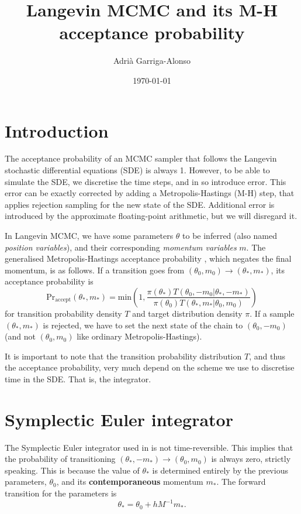 \documentclass{article}
\author{Adrià Garriga-Alonso}
\date{\today}
\title{Langevin MCMC and its M-H acceptance probability}
\begin{document}
\maketitle
{}

\section{Introduction}
\label{sec:orgb532d68}
The acceptance probability of an MCMC sampler that follows the Langevin
stochastic differential equations (SDE) is always 1. However, to be able to
simulate the SDE, we discretise the time steps, and in so introduce error.
This error can be exactly corrected \cite{sarkka_solin_2019} by adding a
Metropolis-Hastings (M-H) step, that applies rejection sampling for the new
state of the SDE. Additional error is introduced by the approximate
floating-point arithmetic, but we will disregard it.

In Langevin MCMC, we have some parameters \(\theta\) to be inferred (also named
\emph{position variables}), and their corresponding \emph{momentum variables} \(m\). The
generalised Metropolis-Hastings acceptance probability \cite{song2020hams},
which negates the final momentum, is as follows. If a transition goes from 
\((\theta_0, m_0) \to (\theta_*, m_*)\), its acceptance probability is
\begin{equation}
  \text{Pr}_\text{accept}(\theta_*, m_*) = \text{min}\left(1,
      \frac{\pi(\theta_*) T(\theta_0, -m_0 | \theta_*, -m_*)}
          {\pi(\theta_0) T(\theta_*, m_* | \theta_0, m_0)} \right)
\end{equation}
for transition probability density \(T\) and target distribution density \(\pi\).
If a sample \((\theta_*, m_*)\) is rejected, we have to set the next state of
the chain to \((\theta_0, -m_0)\) (and not \((\theta_0, m_0)\) like ordinary
Metropolis-Hastings).

It is important to note that the transition probability distribution \(T\), and
thus the acceptance probability, very much depend on the scheme we use to
discretise time in the SDE. That is, the integrator.

\section{Symplectic Euler integrator}
\label{sec:org786af88}
The Symplectic Euler integrator used in \cite{wenzel20posterior} is not
time-reversible. This implies that the probability of transitioning
\((\theta_*, -m_*) \to (\theta_0, m_0)\) is always zero, strictly speaking.
This is because the value of \(\theta_*\) is determined entirely by the
previous parameters, \(\theta_0\), and its \textbf{contemporaneous} momentum \(m_*\).
The forward transition for the parameters is
\begin{equation}
  \theta_* = \theta_0 + h M^{-1} m_*.
\end{equation}
\end{document}
